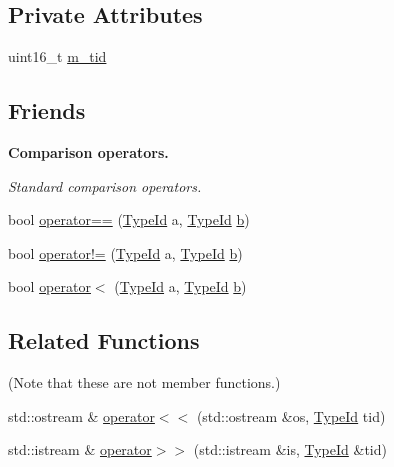 \subsection*{Private Attributes}
\begin{DoxyCompactItemize}
\item 
uint16\+\_\+t \hyperlink{classns3_1_1TypeId_a870eb8c443cc473d09bcdef7d32cec59}{m\+\_\+tid}
\end{DoxyCompactItemize}
\subsection*{Friends}
\begin{Indent}{\bf Comparison operators.}\par
{\em Standard comparison operators. }\begin{DoxyCompactItemize}
\item 
bool \hyperlink{classns3_1_1TypeId_a8d876eeddf2efbb13771fc78b015de07}{operator==} (\hyperlink{classns3_1_1TypeId}{Type\+Id} a, \hyperlink{classns3_1_1TypeId}{Type\+Id} \hyperlink{lte__pathloss_8m_a21ad0bd836b90d08f4cf640b4c298e7c}{b})
\item 
bool \hyperlink{classns3_1_1TypeId_a050a56023cc434ef54458f201c7c805d}{operator!=} (\hyperlink{classns3_1_1TypeId}{Type\+Id} a, \hyperlink{classns3_1_1TypeId}{Type\+Id} \hyperlink{lte__pathloss_8m_a21ad0bd836b90d08f4cf640b4c298e7c}{b})
\item 
bool \hyperlink{classns3_1_1TypeId_aa807478dfdf68a98643c4e7a777af947}{operator$<$} (\hyperlink{classns3_1_1TypeId}{Type\+Id} a, \hyperlink{classns3_1_1TypeId}{Type\+Id} \hyperlink{lte__pathloss_8m_a21ad0bd836b90d08f4cf640b4c298e7c}{b})
\end{DoxyCompactItemize}
\end{Indent}
\subsection*{Related Functions}
(Note that these are not member functions.) \begin{DoxyCompactItemize}
\item 
std\+::ostream \& \hyperlink{classns3_1_1TypeId_a4b6de61c9446dd835cf938e0f1366bc9}{operator$<$$<$} (std\+::ostream \&os, \hyperlink{classns3_1_1TypeId}{Type\+Id} tid)
\item 
std\+::istream \& \hyperlink{classns3_1_1TypeId_a27216ec2e66c9ba541a53fd4f2854cb7}{operator$>$$>$} (std\+::istream \&is, \hyperlink{classns3_1_1TypeId}{Type\+Id} \&tid)
\end{DoxyCompactItemize}


